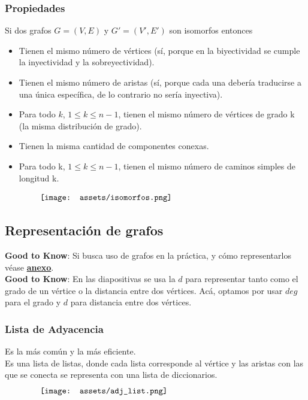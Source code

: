\documentclass[10pt,a4paper]{article}
\begin{document}
\subsubsection*{Propiedades}
Si dos grafos $G = (V,E)$ y $G' = (V', E')$ son isomorfos entonces
\begin{itemize}
    \item Tienen el mismo número de vértices (sí, porque en la biyectividad se cumple la inyectividad y la sobreyectividad).
    \item Tienen el mismo número de aristas (sí, porque cada una debería traducirse a una única específica, de lo contrario no sería inyectiva).
    \item Para todo $k$, $1 \le k \le n-1$, tienen el mismo número de vértices de grado k (la misma distribución de grado).
    \item Tienen la misma cantidad de componentes conexas.
    \item Para todo k, $1 \le k \le n-1$, tienen el mismo número de caminos simples de longitud k.
\end{itemize}
\[\begin{minipage}[b]{0.8\textwidth}
    \texttt{[image: assets/isomorfos.png]}
\end{minipage}\]
\subsection*{Representación de grafos}
\textbf{Good to Know}: Si busca uso de grafos en la práctica, y cómo representarlos véase \hyperref[subsec:representacion_grafos_practica]{\textbf{anexo}}. \\
\textbf{Good to Know}: En las diapositivas se usa la $d$ para representar tanto como el grado de un vértice o la distancia entre dos vértices. Acá, optamos por usar $deg$ para el grado y $d$ para distancia entre dos vértices.
\subsubsection*{Lista de Adyacencia}
Es la más común y la más eficiente. \\
Es una lista de listas, donde cada lista corresponde al vértice y las aristas con las que se conecta se representa con una lista de diccionarios. 
\[\begin{minipage}[b]{0.8\textwidth}
    \texttt{[image: assets/adj\_list.png]}
\end{minipage}\]
\end{document}
